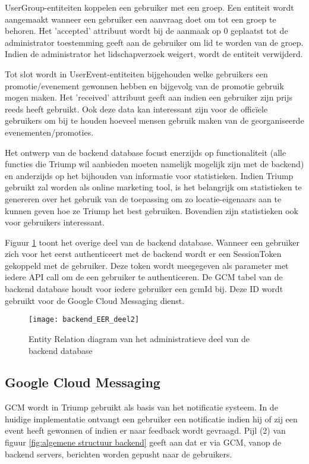UserGroup-entiteiten koppelen een gebruiker met een groep. Een entiteit wordt aangemaakt wanneer een gebruiker een aanvraag doet om tot een groep te behoren. Het 'accepted' attribuut wordt bij de aanmaak op 0 geplaatst tot de administrator toestemming geeft aan de gebruiker om lid te worden van de groep. Indien de administrator het lidschapverzoek weigert, wordt de entiteit verwijderd.

Tot slot wordt in UserEvent-entiteiten bijgehouden welke gebruikers een promotie/evenement gewonnen hebben en bijgevolg van de promotie gebruik mogen maken. Het 'received' attribuut geeft aan indien een gebruiker zijn prijs reeds heeft gebruikt. Ook deze data kan interessant zijn voor de officïele gebruikers om bij te houden hoeveel mensen gebruik maken van de georganiseerde evenementen/promoties.

Het ontwerp van de backend database focust enerzijds op functionaliteit (alle functies die Triump wil aanbieden moeten namelijk mogelijk zijn met de backend) en anderzijds op het bijhouden van informatie voor statistieken. Indien Triump gebruikt zal worden als online marketing tool, is het belangrijk om statistieken te genereren over het gebruik van de toepassing om zo locatie-eigenaars aan te kunnen geven hoe ze Triump het best gebruiken. Bovendien zijn statistieken ook voor gebruikers interessant.

Figuur \ref{fig:Backend ER 2} toont het overige deel van de backend database. Wanneer een gebruiker zich voor het eerst authenticeert met de backend wordt er een SessionToken gekoppeld met de gebruiker. Deze token wordt meegegeven als parameter met iedere API call om de een gebruiker te authenticeren. De GCM tabel van de backend database houdt voor iedere gebruiker een gcmId bij. Deze ID wordt gebruikt voor de Google Cloud Messaging dienst.

\begin{figure}[H]
	\centering
	\texttt{[image: backend\_EER\_deel2]}
	\caption{Entity Relation diagram van het administratieve deel van de backend database}
	\label{fig:Backend ER 2}
\end{figure}
\subsection{Google Cloud Messaging}
GCM wordt in Triump gebruikt als basis van het notificatie systeem. In de huidige implementatie ontvangt een gebruiker een notificatie indien hij of zij een event heeft gewonnen of indien er naar feedback wordt gevraagd. 
Pijl (2) van figuur \ref{fig:algemene structuur backend} geeft aan dat er via GCM, vanop de backend servers, berichten worden gepusht naar de gebruikers.

